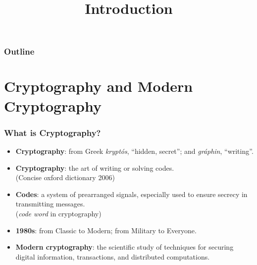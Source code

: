 

\title{Introduction}


\maketitle
\begin{frame}
\frametitle{Outline}
\tableofcontents
\end{frame}
\section{Cryptography and Modern Cryptography}
\begin{frame}\frametitle{What is Cryptography?}
\begin{itemize}
\item \textbf{Cryptography}: from Greek \emph{krypt\'os}, ``hidden, secret''; and \emph{gr\'{a}phin}, ``writing''.
\item \textbf{Cryptography}: the art of writing or solving codes.\\ (Concise oxford dictionary 2006)
\item \textbf{Codes}: a system of prearranged signals, especially used to ensure secrecy in transmitting messages. \\ (\emph{code word} in cryptography)
\item \textbf{1980s}: from Classic to Modern; from Military to Everyone.
\item \textbf{Modern cryptography}: the scientific study of techniques for securing digital information, transactions, and distributed computations.
\end{itemize}
\end{frame}

